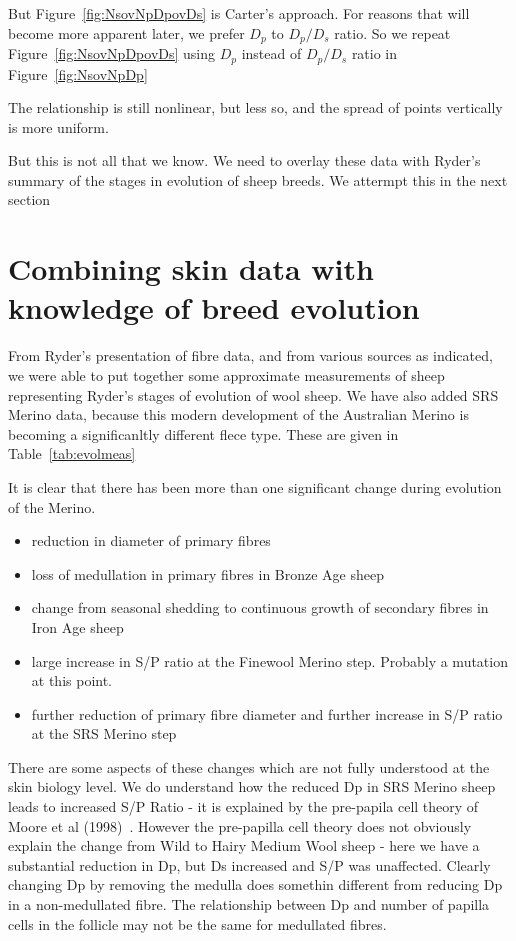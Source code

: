 \documentclass[titlepage]{article}  %
\begin{document}
But Figure~\ref{fig:NsovNpDpovDs} is Carter's approach. For reasons that will become more apparent later, we prefer $D_{p}$ to $D_{p}/D_{s}$ ratio. So we repeat Figure~\ref{fig:NsovNpDpovDs} using $D_{p}$ instead of $D_{p}/D_{s}$ ratio in Figure~\ref{fig:NsovNpDp}

The relationship is still nonlinear, but less so, and the spread of points vertically is more uniform.

But this is not all that we know. We need to overlay these data with Ryder's summary of the stages in evolution of sheep breeds. We attermpt this in the next section

\section{Combining skin data with knowledge of breed evolution}
From Ryder's presentation of fibre data, and from various sources as indicated, we were able to put together some approximate measurements of sheep representing Ryder's stages of evolution of wool sheep. We have also added  SRS Merino data, because this modern development of the Australian Merino is becoming a significanltly different flece type. These are given in Table~\ref{tab:evolmeas}

It is clear that there has been more than one significant change during evolution of the Merino. 
\begin{itemize}
\item reduction in diameter of primary fibres
\item loss of medullation in primary fibres in Bronze Age sheep
\item change from seasonal shedding to continuous growth of secondary fibres in Iron Age sheep
\item large increase in S/P ratio at the Finewool Merino step. Probably a mutation at this point.
\item further reduction of primary fibre diameter and further increase in S/P ratio at the SRS Merino step
\end{itemize}
There are some aspects of these changes which are not fully understood at the skin biology level. We do understand  how the reduced Dp in SRS Merino sheep leads to increased S/P Ratio - it is explained by the pre-papila cell theory of Moore et al (1998)~\cite{moor:98}. However the pre-papilla cell theory does not obviously explain the change from Wild to Hairy Medium Wool sheep - here we have a substantial reduction in Dp, but Ds increased and S/P was unaffected. Clearly changing Dp by removing the medulla does somethin different from reducing Dp in a non-medullated fibre. The relationship between Dp and number of papilla cells in the follicle may not be the same for medullated fibres.
\end{document}
